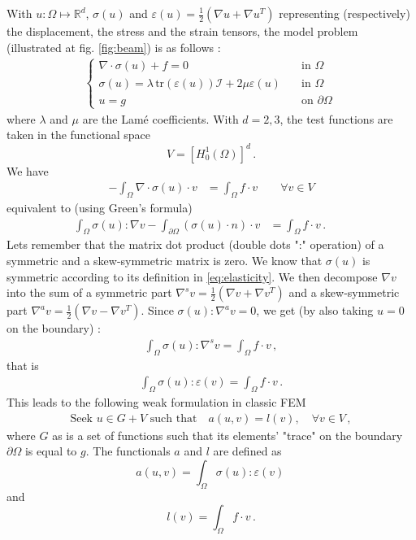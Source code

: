 With $u: \Omega \mapsto \mathbb{R}^d$, $\sigma(u)$ and $\varepsilon (u) = \frac{1}{2}(\nabla u + \nabla u^T)$ representing (respectively) the displacement, the stress and the strain tensors, the model problem (illustrated at fig. \ref{fig:beam}) is as follows \parencite[p.153]{ern2013theory} :
\begin{align}
    \begin{cases}
    \nabla \cdot \sigma(u) + f = 0 &\quad \text{in } \Omega \,\\   
    \sigma(u) = \lambda \, \text{tr}(\varepsilon(u)) \mathcal{I} + 2 \mu \varepsilon(u)  &\quad \text{in } \Omega \,\\
    u = g &\quad \text{on } \partial\Omega \,
    \end{cases}
    \label{eq:elasticity}
\end{align}
where $\lambda$ and $\mu$ are the Lamé coefficients. With $d=2,3$, the test functions are taken in the functional space 
$$
V = \left[  H_0^1(\Omega)\right]^d \,.
$$
We have
\begin{align*}
    - \int_{\Omega} \nabla \cdot \sigma(u) \cdot v &= \int_{\Omega} f \cdot v \qquad \forall v \in V
\end{align*}
equivalent to (using Green's formula)
\begin{align*}
    \int_{\Omega} \sigma(u) : \nabla v - \int_{\partial\Omega} (\sigma(u) \cdot n) \cdot v &= \int_{\Omega} f \cdot v \,. \qquad \tag{$\star$}
\end{align*}
Lets remember that the matrix dot product (double dots ":" operation) of a symmetric and a skew-symmetric matrix is zero. We know that $\sigma(u)$ is symmetric according to its definition in \eqref{eq:elasticity}. We then decompose $\nabla v$ into the sum of a symmetric part $\nabla^s v  = \frac{1}{2}\left( \nabla v + \nabla v^T  \right)$ and a skew-symmetric part $\nabla^a v  = \frac{1}{2}\left( \nabla v - \nabla v^T  \right)$. Since $\sigma(u):\nabla^a v = 0$, we get (by also taking $u = 0$ on the boundary) :  
\begin{align*}
    \int_{\Omega} \sigma(u) : \nabla^s v = \int_{\Omega} f \cdot v  \,, 
\end{align*}
that is
\begin{align*}
    \int_{\Omega} \sigma(u) : \varepsilon(v) = \int_{\Omega} f \cdot v  \,.
\end{align*}
This leads to the following weak formulation in classic FEM
\begin{align}
    \text{Seek } u \in G+V \text{ such that} \quad a(u,v)=l(v), \quad \forall v \in V \,,
\end{align}
where $G$ as is a set of functions such that its elements' "trace" on the boundary $\partial\Omega$ is equal to $g$. The functionals $a$ and $l$ are defined as 
$$
a(u,v) = \int_{\Omega} \sigma (u) : \varepsilon (v) \,
$$
and
$$
l(v) = \int_{\Omega} f\cdot v \,.
$$

